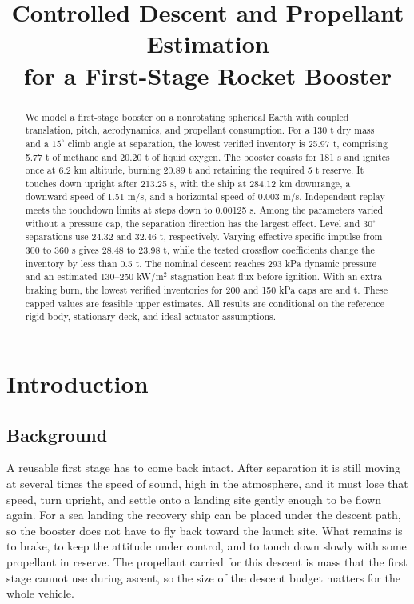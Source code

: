 \documentclass[12pt,a4paper]{article}
\title{Controlled Descent and Propellant Estimation\\for a First-Stage Rocket Booster}
\author{}
\date{}
\begin{document}
\renewcommand{\abstractname}{Summary}
\begin{abstract}
We model a first-stage booster on a nonrotating spherical Earth with coupled translation, pitch, aerodynamics, and propellant consumption. For a 130 t dry mass and a $15^\circ$ climb angle at separation, the lowest verified inventory is 25.97 t, comprising 5.77 t of methane and 20.20 t of liquid oxygen. The booster coasts for 181 s and ignites once at 6.2 km altitude, burning 20.89 t and retaining the required 5 t reserve. It touches down upright after 213.25 s, with the ship at 284.12 km downrange, a downward speed of 1.51 m/s, and a horizontal speed of 0.003 m/s. Independent replay meets the touchdown limits at steps down to 0.00125 s. Among the parameters varied without a pressure cap, the separation direction has the largest effect. Level and $30^\circ$ separations use 24.32 and 32.46 t, respectively. Varying effective specific impulse from 300 to 360 s gives 28.48 to 23.98 t, while the tested crossflow coefficients change the inventory by less than 0.5 t. The nominal descent reaches 293 kPa dynamic pressure and an estimated 130--250 kW/m$^2$ stagnation heat flux before ignition. With an extra braking burn, the lowest verified inventories for 200 and 150 kPa caps are \QcapTwoHundred{} and \QcapOneFifty{} t. These capped values are feasible upper estimates. All results are conditional on the reference rigid-body, stationary-deck, and ideal-actuator assumptions.
\end{abstract}
\clearpage
\begingroup\small
\tableofcontents
\endgroup
\clearpage
\section{Introduction}
\subsection{Background}
A reusable first stage has to come back intact. After separation it is still moving at several times the speed of sound, high in the atmosphere, and it must lose that speed, turn upright, and settle onto a landing site gently enough to be flown again. For a sea landing the recovery ship can be placed under the descent path, so the booster does not have to fly back toward the launch site. What remains is to brake, to keep the attitude under control, and to touch down slowly with some propellant in reserve. The propellant carried for this descent is mass that the first stage cannot use during ascent, so the size of the descent budget matters for the whole vehicle.
\end{document}
